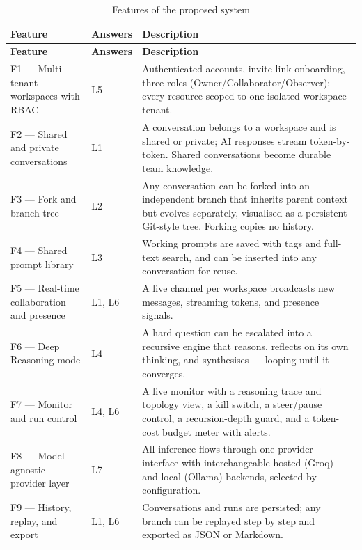 \documentclass[12pt,a4paper]{report}
\begin{document}
\begingroup
\setlength{\parskip}{0pt}\renewcommand{\arraystretch}{1.32}\footnotesize
\begin{xltabular}{\textwidth}{>{\hsize\raggedright\arraybackslash}X >{\hsize\raggedright\arraybackslash}X >{\hsize\raggedright\arraybackslash}X}
\caption{Features of the proposed system}\\
\toprule
\textbf{Feature} & \textbf{Answers} & \textbf{Description} \\
\midrule\endfirsthead
\toprule
\textbf{Feature} & \textbf{Answers} & \textbf{Description} \\
\midrule\endhead
\bottomrule\endfoot
F1 --- Multi-tenant workspaces with RBAC & L5 & Authenticated accounts, invite-link onboarding, three roles (Owner/Collaborator/Observer); every resource scoped to one isolated workspace tenant. \\
F2 --- Shared and private conversations & L1 & A conversation belongs to a workspace and is shared or private; AI responses stream token-by-token. Shared conversations become durable team knowledge. \\
F3 --- Fork and branch tree & L2 & Any conversation can be forked into an independent branch that inherits parent context but evolves separately, visualised as a persistent Git-style tree. Forking copies no history. \\
F4 --- Shared prompt library & L3 & Working prompts are saved with tags and full-text search, and can be inserted into any conversation for reuse. \\
F5 --- Real-time collaboration and presence & L1, L6 & A live channel per workspace broadcasts new messages, streaming tokens, and presence signals. \\
F6 --- Deep Reasoning mode & L4 & A hard question can be escalated into a recursive engine that reasons, reflects on its own thinking, and synthesises --- looping until it converges. \\
F7 --- Monitor and run control & L4, L6 & A live monitor with a reasoning trace and topology view, a kill switch, a steer/pause control, a recursion-depth guard, and a token-cost budget meter with alerts. \\
F8 --- Model-agnostic provider layer & L7 & All inference flows through one provider interface with interchangeable hosted (Groq) and local (Ollama) backends, selected by configuration. \\
F9 --- History, replay, and export & L1, L6 & Conversations and runs are persisted; any branch can be replayed step by step and exported as JSON or Markdown. \\
\end{xltabular}
\endgroup
\end{document}
